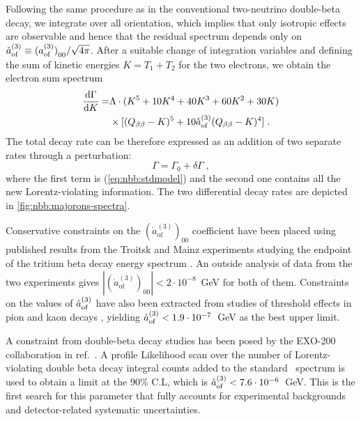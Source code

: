 Following the same procedure as in the conventional two-neutrino double-beta
decay, we integrate over all orientation, which implies that only isotropic
effects are observable and hence that the residual spectrum depends only on
$\mathring{a}_\text{of}^{(3)}\equiv{(a_\text{of}^{(3)})}_{00}/\sqrt{4\pi}$. After a suitable change of
integration variables and defining the sum of kinetic energies $K=T_1+T_2$ for
the two electrons, we obtain the electron sum spectrum
\begin{equation}\label{eq:nbb:totwidth}
  \begin{split}
    \frac{\text{d}\Gamma}{\text{d}K} = &
      \Lambda \cdot (K^5 + 10K^4 + 40K^3 + 60K^2 + 30K) \\
      & \times[(Q_{\beta\beta} - K)^5 + 10\mathring{a}_\text{of}^{(3)}(Q_{\beta\beta} - K)^4] \;. \\
  \end{split}
\end{equation}
The total decay rate can be therefore expressed as an addition of two separate
rates through a perturbation:
\[
  \Gamma = \Gamma_0 + \delta\Gamma \;,
\]
where the first term is (\ref{eq:nbb:stdmodel}) and the second one contains all the
new Lorentz-violating information. The two differential decay rates are
depicted in \cref{fig:nbb:majorons-spectra}.

Conservative constraints on the $(\mathring{a}^{(3)}_\text{of})_{00}$
coefficient have been placed using published results from the Troitsk and Mainz
experiments studying the endpoint of the tritium beta decay energy spectrum
\cite{Diaz:2013saa}. An outside analysis of data from the two experiments gives
$|(\mathring{a}^{(3)}_\text{of})_{00}|<2\cdot10^{-8}$~GeV for both of them.
Constraints on the values of $\mathring{a}_\text{of}^{(3)}$ have also been extracted from studies of
threshold effects in pion and kaon decays \cite{SMEneutrinos}, yielding
$\mathring{a}_\text{of}^{(3)}<1.9\cdot10^{-7}$~GeV as the best upper limit.

A constraint from double-beta decay studies has been posed by the EXO-200
collaboration in ref.~\cite{exo200}. A profile Likelihood scan over the number
of Lorentz-violating double beta decay integral counts added to the standard
\nnbb\ spectrum is used to obtain a limit at the 90\% C.L, which is
$\mathring{a}_\text{of}^{(3)}<7.6\cdot10^{-6}$~GeV. This is the first search for this parameter that
fully accounts for experimental backgrounds and detector-related systematic
uncertainties.
